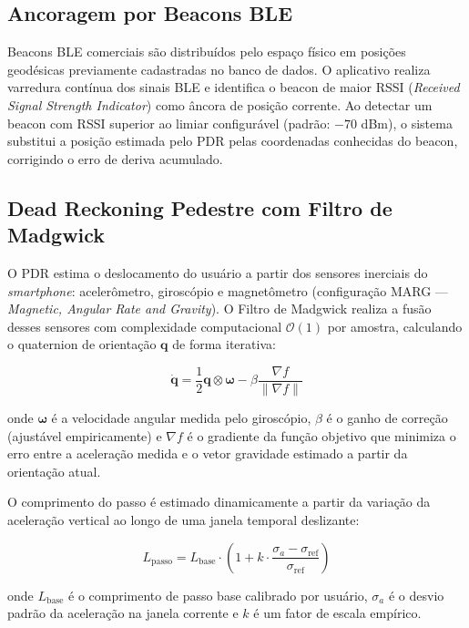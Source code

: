 \documentclass[12pt]{article}
\begin{document}
\subsection{Ancoragem por Beacons BLE}

Beacons BLE comerciais são distribuídos pelo espaço físico em posições geodésicas
previamente cadastradas no banco de dados. O aplicativo realiza varredura contínua
dos sinais BLE e identifica o beacon de maior RSSI (\textit{Received Signal Strength
Indicator}) como âncora de posição corrente. Ao detectar um beacon com RSSI superior
ao limiar configurável (padrão: $-70$ dBm), o sistema substitui a posição estimada
pelo PDR pelas coordenadas conhecidas do beacon, corrigindo o erro de deriva acumulado.

\subsection{Dead Reckoning Pedestre com Filtro de Madgwick}

O PDR estima o deslocamento do usuário a partir dos sensores inerciais do
\textit{smartphone}: acelerômetro, giroscópio e magnetômetro (configuração MARG —
\textit{Magnetic, Angular Rate and Gravity}). O Filtro de Madgwick \cite{Madgwick2010}
realiza a fusão desses sensores com complexidade computacional $\mathcal{O}(1)$ por
amostra, calculando o quaternion de orientação $\mathbf{q}$ de forma iterativa:

\begin{equation}
  \dot{\mathbf{q}} = \frac{1}{2}\mathbf{q} \otimes \boldsymbol{\omega} -
  \beta \frac{\nabla f}{\|\nabla f\|}
  \label{eq:madgwick}
\end{equation}

\noindent onde $\boldsymbol{\omega}$ é a velocidade angular medida pelo giroscópio,
$\beta$ é o ganho de correção (ajustável empiricamente) e $\nabla f$ é o gradiente
da função objetivo que minimiza o erro entre a aceleração medida e o vetor gravidade
estimado a partir da orientação atual.

O comprimento do passo é estimado dinamicamente a partir da variação da aceleração
vertical ao longo de uma janela temporal deslizante:

\begin{equation}
  L_{\text{passo}} = L_{\text{base}} \cdot \left(1 + k \cdot
  \frac{\sigma_a - \sigma_{\text{ref}}}{\sigma_{\text{ref}}}\right)
  \label{eq:step}
\end{equation}

\noindent onde $L_{\text{base}}$ é o comprimento de passo base calibrado por
usuário, $\sigma_a$ é o desvio padrão da aceleração na janela corrente e $k$
é um fator de escala empírico.
\end{document}

